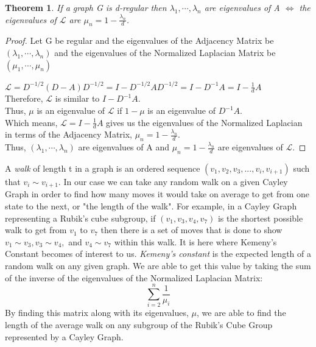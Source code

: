 \documentclass{article}
\newtheorem{theorem}{Theorem}[section]
\begin{document}
\begin{theorem}
If a graph G is d-regular then $\lambda_1,\cdots, \lambda_n$ are eigenvalues of A $\iff$ the eigenvalues of $\mathcal{L}$ are $\mu_n = 1 - \frac{\lambda_n}{d}$. 
\end{theorem}

\begin{proof}
    Let G be regular and the eigenvalues of the Adjacency Matrix be $(\lambda_1,\cdots, \lambda_n)$ and the eigenvalues of the Normalized Laplacian Matrix be $(\mu_1,\cdots, \mu_n)$
    
    $\mathcal{L} = D^{-1/2}(D-A)D^{-1/2} = I - D^{-1/2}AD^{-1/2} = I - D^{-1}A = I - \frac{1}{d}A$\\
    Therefore, $\mathcal{L}$ is similar to $I - D^{-1}A$.\\
    Thus, $\mu$ is an eigenvalue of $\mathcal{L}$ if $1 - \mu$ is an eigenvalue of $D^{-1}A$.\\
    Which means, $\mathcal{L} = I - \frac{1}{d}A$ gives us the eigenvalues of the Normalized Laplacian in terms of the Adjacency Matrix, $\mu_n = 1 - \frac{\lambda_n}{d}$.\\  Thus, $(\lambda_1,\cdots, \lambda_n)$ are eigenvalues of A and $\mu_n = 1 - \frac{\lambda_n}{d}$ are eigenvalues of $\mathcal{L}$. 

\end{proof}

A \emph{walk} of length t in a graph is an ordered sequence $(v_1,v_2,v_3,...,v_i,v_{i+1})$ such that $v_i \sim v_{i+1}$.  In our case we can take any random walk on a given Cayley Graph in order to find how many moves it would take on average to get from one state to the next, or "the length of the walk".  For example, in a Cayley Graph representing a Rubik's cube subgroup, if $(v_1,v_3,v_4,v_7)$ is the shortest possible walk to get from $v_1$ to $v_7$ then there is a set of moves that is done to show $v_1 \sim v_3, v_3 \sim v_4,$ and $v_4 \sim v_7$ within this walk.  It is here where Kemeny's Constant becomes of interest to us.  \emph{Kemeny's constant}  is the expected length of a random walk on any given graph.  We are able to get this value  by taking the sum of the inverse of the eigenvalues of the Normalized Laplacian Matrix: $$\sum^{n}_{i=2}\frac{1}{\mu_i}$$  By finding this matrix along with its eigenvalues, $\mu$, we are able to find the length of the average walk on any subgroup of the Rubik's Cube Group represented by a Cayley Graph.
\end{document}
